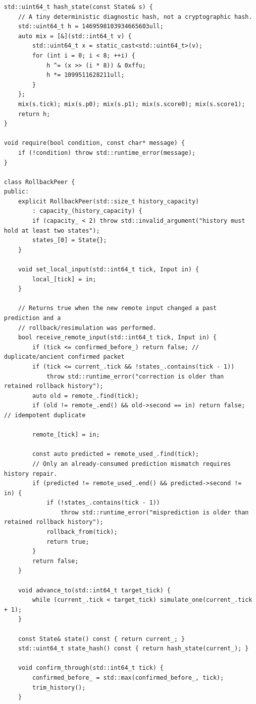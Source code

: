 \begin{verbatim}
std::uint64_t hash_state(const State& s) {
    // A tiny deterministic diagnostic hash, not a cryptographic hash.
    std::uint64_t h = 1469598103934665603ull;
    auto mix = [&](std::int64_t v) {
        std::uint64_t x = static_cast<std::uint64_t>(v);
        for (int i = 0; i < 8; ++i) {
            h ^= (x >> (i * 8)) & 0xffu;
            h *= 1099511628211ull;
        }
    };
    mix(s.tick); mix(s.p0); mix(s.p1); mix(s.score0); mix(s.score1);
    return h;
}

void require(bool condition, const char* message) {
    if (!condition) throw std::runtime_error(message);
}

class RollbackPeer {
public:
    explicit RollbackPeer(std::size_t history_capacity)
        : capacity_(history_capacity) {
        if (capacity_ < 2) throw std::invalid_argument("history must hold at least two states");
        states_[0] = State{};
    }

    void set_local_input(std::int64_t tick, Input in) {
        local_[tick] = in;
    }

    // Returns true when the new remote input changed a past prediction and a
    // rollback/resimulation was performed.
    bool receive_remote_input(std::int64_t tick, Input in) {
        if (tick <= confirmed_before_) return false; // duplicate/ancient confirmed packet
        if (tick <= current_.tick && !states_.contains(tick - 1))
            throw std::runtime_error("correction is older than retained rollback history");
        auto old = remote_.find(tick);
        if (old != remote_.end() && old->second == in) return false; // idempotent duplicate

        remote_[tick] = in;

        const auto predicted = remote_used_.find(tick);
        // Only an already-consumed prediction mismatch requires history repair.
        if (predicted != remote_used_.end() && predicted->second != in) {
            if (!states_.contains(tick - 1))
                throw std::runtime_error("misprediction is older than retained rollback history");
            rollback_from(tick);
            return true;
        }
        return false;
    }

    void advance_to(std::int64_t target_tick) {
        while (current_.tick < target_tick) simulate_one(current_.tick + 1);
    }

    const State& state() const { return current_; }
    std::uint64_t state_hash() const { return hash_state(current_); }

    void confirm_through(std::int64_t tick) {
        confirmed_before_ = std::max(confirmed_before_, tick);
        trim_history();
    }


\end{verbatim}
